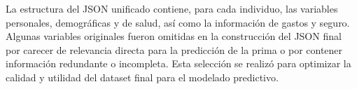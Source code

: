 \documentclass[12pt,a4paper]{article}
\begin{document}
La estructura del JSON unificado contiene, para cada individuo, las variables personales, demográficas y de salud, así como la información de gastos y seguro. Algunas variables originales fueron omitidas en la construcción del JSON final por carecer de relevancia directa para la predicción de la prima o por contener información redundante o incompleta. Esta selección se realizó para optimizar la calidad y utilidad del dataset final para el modelado predictivo.
\end{document}
